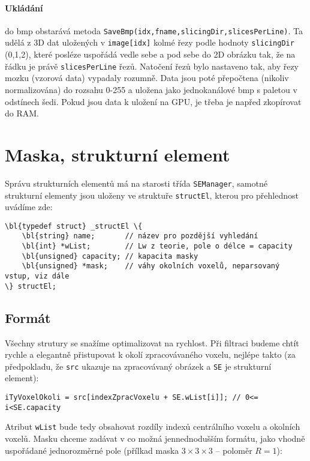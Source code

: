         \paragraph{Ukládání} do bmp obstarává metoda {\tt SaveBmp(idx,fname,slicingDir,slicesPerLine)}. Ta udělá z 3D dat uložených v {\tt image[idx]} kolmé řezy podle hodnoty {\tt slicingDir} (0,1,2), které posléze uspořádá vedle sebe a pod sebe do 2D obrázku tak, že na řádku je právě {\tt slicesPerLine} řezů. Natočení řezů bylo nastaveno tak, aby řezy mozku (vzorová data) vypadaly rozumně. Data jsou poté přepočtena (nikoliv normalizována) do rozsahu 0-255 a uložena jako jednokanálové bmp s paletou v odstínech šedi. Pokud jsou data k uložení na GPU, je třeba je napřed zkopírovat do RAM.

    \section{Maska, strukturní element}

    Správu strukturních elementů má na starosti třída {\tt SEManager}, samotné strukturní elementy jsou uloženy ve struktuře {\tt structEl}, kterou pro přehlednost uvádíme zde:

    \begin{Verbatim}[commandchars = \\\{\}]
\bl{typedef struct} _structEl \{
    \bl{string} name;       // název pro pozdější vyhledání
    \bl{int} *wList;        // Lw z teorie, pole o délce = capacity
    \bl{unsigned} capacity; // kapacita masky
    \bl{unsigned} *mask;    // váhy okolních voxelů, neparsovaný vstup, viz dále
\} structEl;
    \end{Verbatim}

    \subsection{Formát}

    Všechny strutury se snažíme optimalizovat na rychlost. Při filtraci budeme chtít rychle a elegantně přistupovat k okolí zpracovávaného voxelu, nejlépe takto (za předpokladu, že {\tt src} ukazuje na zpracovávaný obrázek a {\tt SE} je strukturní element):

    \begin{Verbatim}
iTyVoxelOkoli = src[indexZpracVoxelu + SE.wList[i]]; // 0<= i<SE.capacity
    \end{Verbatim}

    Atribut {\tt wList} bude tedy obsahovat rozdíly indexů centrálního voxelu a okolních voxelů. Masku chceme zadávat v co možná jennednodušším formátu, jako vhodně uspořádané jednorozměrné pole (přílkad maska $3\times 3\times3$ -- poloměr $R = 1$):


